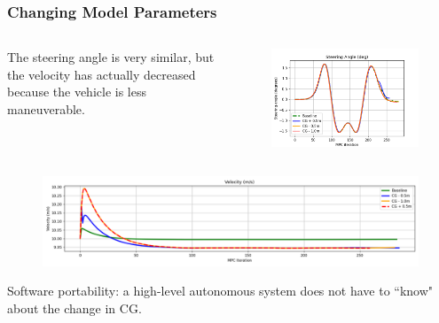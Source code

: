 \documentclass{beamer}
\begin{document}
\begin{frame}
\frametitle{Changing Model Parameters}

\vspace{-1.0em}
\begin{columns}
	\begin{column}{0.4\linewidth}

The steering angle is very similar, but the velocity has actually decreased because the vehicle is less maneuverable.
	\end{column}
\begin{column}{0.6\linewidth}

\begin{figure}
	\includegraphics[width=1.0\linewidth]{figures/steering_angle_cg.png}
\end{figure}
\end{column}
\end{columns}

\begin{figure}
	\includegraphics[width=1.0\linewidth]{figures/velocity_cg.png}
\end{figure}
\vspace{-0.5em}

Software portability: a high-level autonomous system does not have to ``know" about the change in CG.
\end{frame}
\end{document}
